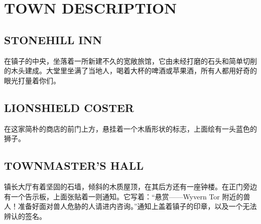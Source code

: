 \documentclass[letterpaper,twocolumn,openany,nodeprecatedcode]{dndbook}
\begin{document}
\section{TOWN DESCRIPTION}
\subsection{STONEHILL INN}
\begin{DndReadAloud}
  \begin{chinese}
    在镇子的中央，坐落着一所新建不久的宽敞旅馆，它由未经打磨的石头和简单切削的木头建成。大堂里坐满了当地人，喝着大杯的啤酒或苹果酒，所有人都用好奇的眼光打量着你们。
  \end{chinese}
\end{DndReadAloud}

\subsection{LIONSHIELD COSTER}
\begin{DndReadAloud}
  \begin{chinese}
    在这家简朴的商店的前门上方，悬挂着一个木盾形状的标志，上面绘有一头蓝色的狮子。
  \end{chinese}
\end{DndReadAloud}

\subsection{TOWNMASTER'S HALL}
\begin{DndReadAloud}
  \begin{chinese}
    镇长大厅有着坚固的石墙，倾斜的木质屋顶，在其后方还有一座钟楼。在正门旁边有一个告示板，上面张贴着一则通知。它写着：“悬赏——Wyvern Tor 附近的兽人！准备好面对兽人危胁的人请进内咨询。”通知上盖着镇子的印章，以及一个无法辨认的签名。
  \end{chinese}
\end{DndReadAloud}
\end{document}
